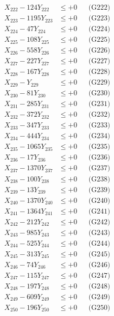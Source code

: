 \documentclass[a4paper,10pt]{article}
\begin{document}
{\begin{align}
X_{222} - 124Y_{222} &\leq +0 && \text{(G222)} \\
X_{223} - 1195Y_{223} &\leq +0 && \text{(G223)} \\
X_{224} - 47Y_{224} &\leq +0 && \text{(G224)} \\
X_{225} - 108Y_{225} &\leq +0 && \text{(G225)} \\
X_{226} - 558Y_{226} &\leq +0 && \text{(G226)} \\
X_{227} - 227Y_{227} &\leq +0 && \text{(G227)} \\
X_{228} - 167Y_{228} &\leq +0 && \text{(G228)} \\
X_{229} - Y_{229} &\leq +0 && \text{(G229)} \\
X_{230} - 81Y_{230} &\leq +0 && \text{(G230)} \\
\allowbreak
X_{231} - 285Y_{231} &\leq +0 && \text{(G231)} \\
X_{232} - 372Y_{232} &\leq +0 && \text{(G232)} \\
X_{233} - 347Y_{233} &\leq +0 && \text{(G233)} \\
X_{234} - 444Y_{234} &\leq +0 && \text{(G234)} \\
X_{235} - 1065Y_{235} &\leq +0 && \text{(G235)} \\
X_{236} - 17Y_{236} &\leq +0 && \text{(G236)} \\
X_{237} - 1370Y_{237} &\leq +0 && \text{(G237)} \\
X_{238} - 100Y_{238} &\leq +0 && \text{(G238)} \\
X_{239} - 13Y_{239} &\leq +0 && \text{(G239)} \\
X_{240} - 1370Y_{240} &\leq +0 && \text{(G240)} \\
\allowbreak
X_{241} - 1364Y_{241} &\leq +0 && \text{(G241)} \\
X_{242} - 212Y_{242} &\leq +0 && \text{(G242)} \\
X_{243} - 985Y_{243} &\leq +0 && \text{(G243)} \\
X_{244} - 525Y_{244} &\leq +0 && \text{(G244)} \\
X_{245} - 313Y_{245} &\leq +0 && \text{(G245)} \\
X_{246} - 74Y_{246} &\leq +0 && \text{(G246)} \\
X_{247} - 115Y_{247} &\leq +0 && \text{(G247)} \\
X_{248} - 197Y_{248} &\leq +0 && \text{(G248)} \\
X_{249} - 609Y_{249} &\leq +0 && \text{(G249)} \\
X_{250} - 196Y_{250} &\leq +0 && \text{(G250)} \\

\end{align}}
\end{document}
